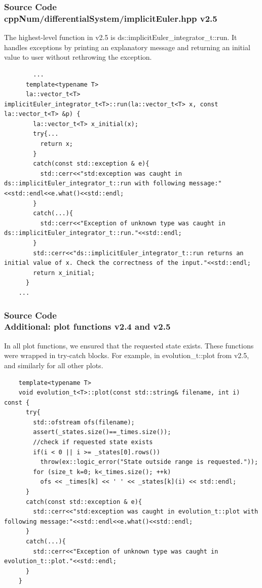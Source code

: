 \documentclass[ucs,10pt]{beamer}
\begin{document}
\begin{frame}[fragile]
\frametitle{Source Code \\
        \small \color{rwth-blue} cppNum/differentialSystem/implicitEuler.hpp v2.5 }
	The highest-level function in v2.5 is ds::implicitEuler\_integrator\_t::run. It handles exceptions by printing an explanatory message and returning an initial value to user without rethrowing the exception.
        \begin{lstlisting}
        ...
	  template<typename T>
	  la::vector_t<T> implicitEuler_integrator_t<T>::run(la::vector_t<T> x, const la::vector_t<T> &p) {
	    la::vector_t<T> x_initial(x);
	    try{...
	      return x;
	    }
	    catch(const std::exception & e){
	      std::cerr<<"std:exception was caught in ds::implicitEuler_integrator_t::run with following message:"<<std::endl<<e.what()<<std::endl;
	    }
	    catch(...){
	      std::cerr<<"Exception of unknown type was caught in ds::implicitEuler_integrator_t::run."<<std::endl;
	    }
	    std::cerr<<"ds::implicitEuler_integrator_t::run returns an initial value of x. Check the correctness of the input."<<std::endl;
	    return x_initial;
	  }
	...
        \end{lstlisting}
\end{frame}

\begin{frame}[fragile]
\frametitle{Source Code \\
        \small \color{rwth-blue} Additional: plot functions v2.4 and v2.5 }
	In all plot functions, we ensured that the requested state exists. These functions were wrapped in try-catch blocks. For example, in evolution\_t::plot from v2.5, and similarly for all other plots.
	\begin{lstlisting}
	template<typename T>
	void evolution_t<T>::plot(const std::string& filename, int i) const {
	  try{
	    std::ofstream ofs(filename);
	    assert(_states.size()==_times.size());
	    //check if requested state exists
	    if(i < 0 || i >= _states[0].rows())
	      throw(ex::logic_error("State outside range is requested."));
	    for (size_t k=0; k<_times.size(); ++k)
	      ofs << _times[k] << ' ' << _states[k](i) << std::endl;
	  }
	  catch(const std::exception & e){
	    std::cerr<<"std:exception was caught in evolution_t::plot with following message:"<<std::endl<<e.what()<<std::endl;
	  }
	  catch(...){
	    std::cerr<<"Exception of unknown type was caught in evolution_t::plot."<<std::endl;
	  }
	}
        \end{lstlisting}
\end{frame}
\end{document}

